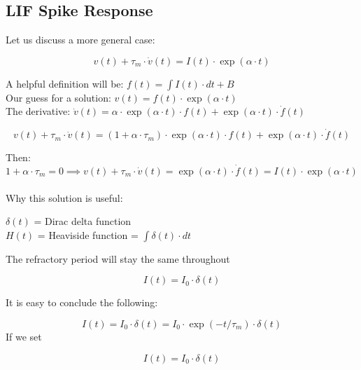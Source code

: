 \subsection{LIF Spike Response}

Let us discuss a more general case:

\begin{equation}
    v(t) + \tau_m \cdot \dot{v}(t) = I(t) \cdot \exp(\alpha \cdot t)
\end{equation}
    
A helpful definition will be: \(f(t) = \int I(t) \cdot dt + B\) \\
Our guess for a solution: \(v(t) = f(t) \cdot \exp(\alpha \cdot t)\) \\
The derivative: \(\dot{v}(t) = \alpha \cdot \exp(\alpha \cdot t) \cdot f(t) + \exp(\alpha \cdot t) \cdot \dot{f}(t)\)
    
\begin{equation}
    v(t) + \tau_m \cdot \dot{v}(t) = (1 + \alpha \cdot \tau_m) \cdot \exp(\alpha \cdot t) \cdot f(t) + \exp(\alpha \cdot t) \cdot \dot{f}(t)
\end{equation}

Then:
\begin{equation} 
    1 + \alpha \cdot \tau_m = 0 \implies v(t) + \tau_m \cdot \dot{v}(t) = \exp(\alpha \cdot t) \cdot \dot{f}(t) = I(t) \cdot \exp(\alpha \cdot t) \label{eq:LIF-exp-sol}
\end{equation}\\


Why this solution is useful:

\(\delta(t)\) = Dirac delta function \\
\(H(t)\) = Heaviside function = \(\int \delta(t) \cdot dt\) 

The refractory period will stay the same throughout  

\begin{equation}
	I(t) = I_0 \cdot \delta(t)
\end{equation}

It is easy to conclude the following: 

\begin{equation}
	I(t) = I_0 \cdot \delta(t) = I_0 \cdot \exp(-t/\tau_m) \cdot \delta(t)
\end{equation}
If we set 

\begin{equation}
	I(t) = I_0 \cdot \delta(t)
\end{equation}

